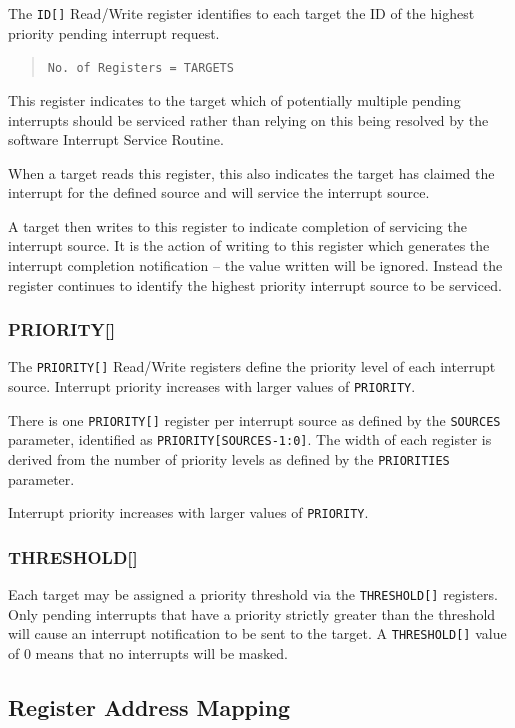 The \texttt{ID[]} Read/Write register identifies to each target the ID of the highest priority pending interrupt request.

\begin{quote}
	\texttt{No.\ of\ Registers\ =\ TARGETS}
\end{quote}

This register indicates to the target which of potentially multiple
pending interrupts should be serviced rather than relying on this being
resolved by the software Interrupt Service Routine.

When a target reads this register, this also indicates the target has
claimed the interrupt for the defined source and will service the interrupt source.

A target then writes to this register to indicate completion of servicing the interrupt source.
It is the action of writing to this register which generates the interrupt completion notification -- the
value written will be ignored. Instead the register continues to identify the highest priority interrupt source to be serviced.

\subsubsection{PRIORITY[]}

The \texttt{PRIORITY[]} Read/Write registers define the priority level of each interrupt source. Interrupt priority increases with larger values of \texttt{PRIORITY}.

There is one \texttt{PRIORITY[]} register per interrupt source as defined by the \texttt{SOURCES} parameter, identified as \texttt{PRIORITY[SOURCES-1:0]}.
The width of each register is derived from the number of priority levels as defined by the \texttt{PRIORITIES} parameter.

Interrupt priority increases with larger values of \texttt{PRIORITY}.

\subsubsection{THRESHOLD[]}

Each target may be assigned a priority threshold via the \texttt{THRESHOLD[]} registers.
Only pending interrupts that have a priority strictly greater than the threshold will cause an interrupt notification to be sent to the target.
A \texttt{THRESHOLD[]} value of 0 means that no interrupts will be masked.

\subsection{Register Address Mapping}

